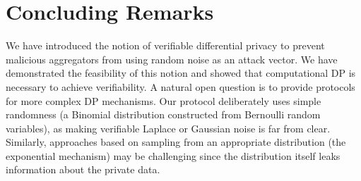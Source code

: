 \section{Concluding Remarks}

We have introduced the notion of verifiable differential privacy to prevent malicious aggregators from using random noise as an attack vector. 
We have demonstrated the feasibility of this notion and showed that computational DP is necessary to achieve verifiability. 
A natural open question is to provide protocols for more complex DP mechanisms.  
Our protocol deliberately uses simple randomness (a Binomial distribution constructed from Bernoulli random variables), as making verifiable Laplace or Gaussian noise is far from clear.  
Similarly, approaches based on sampling from an appropriate distribution (the exponential mechanism) may be challenging since the distribution itself leaks information about the private data. 